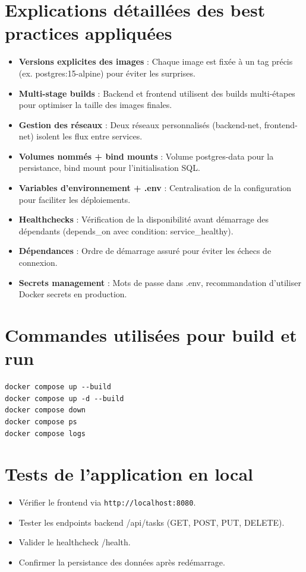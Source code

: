 \documentclass[11pt,a4paper,oneside]{report}
\begin{document}
\section{Explications détaillées des best practices appliquées}
\begin{itemize}
\item \textbf{Versions explicites des images} : Chaque image est fixée à un tag précis (ex. postgres:15-alpine) pour éviter les surprises.
\item \textbf{Multi-stage builds} : Backend et frontend utilisent des builds multi-étapes pour optimiser la taille des images finales.
\item \textbf{Gestion des réseaux} : Deux réseaux personnalisés (backend-net, frontend-net) isolent les flux entre services.
\item \textbf{Volumes nommés + bind mounts} : Volume postgres-data pour la persistance, bind mount pour l'initialisation SQL.
\item \textbf{Variables d'environnement + .env} : Centralisation de la configuration pour faciliter les déploiements.
\item \textbf{Healthchecks} : Vérification de la disponibilité avant démarrage des dépendants (depends\_on avec condition: service\_healthy).
\item \textbf{Dépendances} : Ordre de démarrage assuré pour éviter les échecs de connexion.
\item \textbf{Secrets management} : Mots de passe dans .env, recommandation d'utiliser Docker secrets en production.
\end{itemize}

\section{Commandes utilisées pour build et run}
\begin{lstlisting}
docker compose up --build
docker compose up -d --build
docker compose down
docker compose ps
docker compose logs
\end{lstlisting}

\section{Tests de l'application en local}
\begin{itemize}
\item Vérifier le frontend via \texttt{http://localhost:8080}.
\item Tester les endpoints backend /api/tasks (GET, POST, PUT, DELETE).
\item Valider le healthcheck /health.
\item Confirmer la persistance des données après redémarrage.
\end{itemize}
\end{document}
